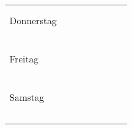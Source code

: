 \documentclass[a4paper]{article}
\begin{document}
\begin{tabular}{lc||p{1.5cm}|p{1.5cm}|p{1.5cm}||p{1.5cm}|p{1.5cm}|p{1.5cm}}
             &         &       &        &          &         &       &      \\
             &         &       &        &          &         &       &      \\
  \midrule
  Donnerstag &         &       &        &          &         &       &      \\
             &         &       &        &          &         &       &      \\
             &         &       &        &          &         &       &      \\
             &         &       &        &          &         &       &      \\
             &         &       &        &          &         &       &      \\
             &         &       &        &          &         &       &      \\
             &         &       &        &          &         &       &      \\
  \midrule
  Freitag    &         &       &        &          &         &       &      \\
             &         &       &        &          &         &       &      \\
             &         &       &        &          &         &       &      \\
             &         &       &        &          &         &       &      \\
             &         &       &        &          &         &       &      \\
             &         &       &        &          &         &       &      \\
             &         &       &        &          &         &       &      \\
  \midrule
  Samstag    &         &       &        &          &         &       &      \\
             &         &       &        &          &         &       &      \\
             &         &       &        &          &         &       &      \\
             &         &       &        &          &         &       &      \\
             &         &       &        &          &         &       &      \\
             &         &       &        &          &         &       &      \\

\end{tabular}
\end{document}
